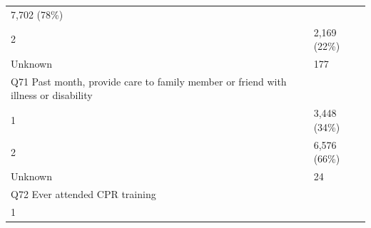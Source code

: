 \documentclass[]{article}
\begin{document}
\begin{longtable}[]{@{}ll@{}}
\begin{minipage}[t]{0.23\columnwidth}
7,702 (78\%)\strut
\end{minipage}\tabularnewline
\begin{minipage}[t]{0.71\columnwidth}\raggedright
2\strut
\end{minipage} & \begin{minipage}[t]{0.23\columnwidth}\raggedright
2,169 (22\%)\strut
\end{minipage}\tabularnewline
\begin{minipage}[t]{0.71\columnwidth}\raggedright
Unknown\strut
\end{minipage} & \begin{minipage}[t]{0.23\columnwidth}\raggedright
177\strut
\end{minipage}\tabularnewline
\begin{minipage}[t]{0.71\columnwidth}\raggedright
Q71 Past month, provide care to family member or friend with illness or
disability\strut
\end{minipage} & \begin{minipage}[t]{0.23\columnwidth}\raggedright
\strut
\end{minipage}\tabularnewline
\begin{minipage}[t]{0.71\columnwidth}\raggedright
1\strut
\end{minipage} & \begin{minipage}[t]{0.23\columnwidth}\raggedright
3,448 (34\%)\strut
\end{minipage}\tabularnewline
\begin{minipage}[t]{0.71\columnwidth}\raggedright
2\strut
\end{minipage} & \begin{minipage}[t]{0.23\columnwidth}\raggedright
6,576 (66\%)\strut
\end{minipage}\tabularnewline
\begin{minipage}[t]{0.71\columnwidth}\raggedright
Unknown\strut
\end{minipage} & \begin{minipage}[t]{0.23\columnwidth}\raggedright
24\strut
\end{minipage}\tabularnewline
\begin{minipage}[t]{0.71\columnwidth}\raggedright
Q72 Ever attended CPR training\strut
\end{minipage} & \begin{minipage}[t]{0.23\columnwidth}\raggedright
\strut
\end{minipage}\tabularnewline
\begin{minipage}[t]{0.71\columnwidth}\raggedright
1\strut

\end{minipage}
\end{longtable}
\end{document}
